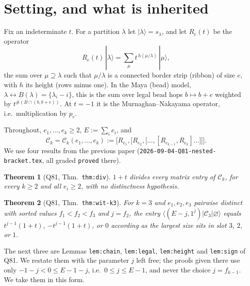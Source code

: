 \documentclass[11pt]{article}
\newtheorem{theorem}{Theorem}
\theoremstyle{definition}
\newcommand{\Ck}{\mathcal{C}}
\begin{document}
\section{Setting, and what is inherited}

Fix an indeterminate $t$.  For a partition $\lambda$ let $|\lambda\rangle=s_\lambda$, and
let $R_e(t)$ be the operator
\[
  R_e(t)\,|\lambda\rangle=\sum_{\mu} t^{\,h(\mu/\lambda)}\,|\mu\rangle ,
\]
the sum over $\mu\supseteq\lambda$ such that $\mu/\lambda$ is a connected border strip
(ribbon) of size $e$, with $h$ its height (rows minus one).  In the Maya (bead) model,
$\lambda\leftrightarrow B(\lambda)=\{\lambda_i-i\}$, this is the sum over legal bead hops
$b\mapsto b+e$ weighted by $t^{\#(B\cap(b,b+e))}$.  At $t=-1$ it is the
Murnaghan--Nakayama operator, i.e.\ multiplication by $p_e$.

Throughout, $e_1,\dots,e_k\ge2$, $E:=\sum_i e_i$, and
\[
  \Ck_k=\Ck_k(e_1,\dots,e_k):=\bigl[R_{e_1},\bigl[R_{e_2},\bigl[\dots,[R_{e_{k-1}},R_{e_k}]\dots\bigr]\bigr]\bigr].
\]
We use four results from the previous paper (\texttt{2026-09-04-Q81-nested-bracket.tex},
all graded \texttt{proved} there).

\begin{theorem}[Q81, Thm.~\texttt{thm:div}]\label{thm:div-cited}
$1+t$ divides every matrix entry of $\Ck_k$, for every $k\ge2$ and all $e_i\ge2$, with
no distinctness hypothesis.
\end{theorem}

\begin{theorem}[Q81, Thm.~\texttt{thm:wit-k3}]\label{thm:wit-cited}
For $k=3$ and $e_1,e_2,e_3$ pairwise distinct with sorted values $f_1<f_2<f_3$ and
$j=f_2$, the entry $\langle (E-j,1^j)|\Ck_3|\varnothing\rangle$ equals $t^{j-1}(1+t)$,
$-t^{j-1}(1+t)$, or $0$ according as the largest size sits in slot $3$, $2$, or $1$.
\end{theorem}

The next three are Lemmas \texttt{lem:chain}, \texttt{lem:legal}, \texttt{lem:height} and
\texttt{lem:sign} of Q81.  We restate them with the parameter $j$ left free; the proofs
given there use only $-1-j<0\le E-1-j$, i.e.\ $0\le j\le E-1$, and never the choice
$j=f_{k-1}$.  We take them in this form.
\end{document}
